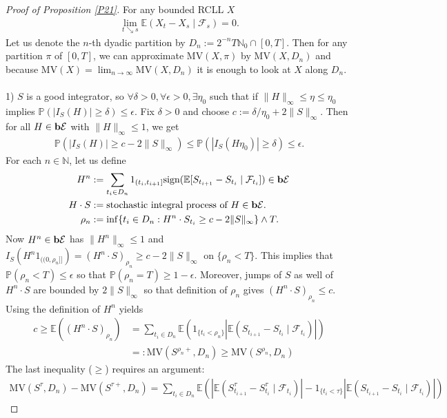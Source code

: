 \documentclass[12pt,a4paper, twoside]{article}
\theoremstyle{definition}
\newcommand{\EE}{\mathbb{E}} %
\newcommand{\PP}{\mathbb{P}} %
\newcommand{\simple}{\textbf{\text{b}}\mathcal{E}}
\newcommand{\sign}{\text{sign}}
\newcommand{\MV}{\text{MV}}
\begin{document}
\begin{proof}[Proof of Proposition \ref{P21}] For any bounded RCLL $X$ 
\begin{align*}
\lim_{t \searrow s} \EE(X_t-X_s \mid \mathcal{F}_s)=0.
\end{align*}
Let us denote the $n$-th dyadic partition by $D_n:= 2^{-n} T \mathbb{N}_0 \cap [0,T]$. Then for any partition $\pi$ of $[0,T]$, we can approximate $\MV(X, \pi)$ by $\MV(X, D_n)$ and because $\MV(X) = \lim_{n \to \infty} \MV(X, D_n)$ it is enough to look at $X$ along $D_n$. 
\\
\\
1) $S$ is a good integrator, so $\forall \delta >0, \forall \epsilon>0, \exists \eta_0$ such that if $\|H\|_\infty \leq \eta \leq \eta_0$ implies $\PP(|I_S(H)| \geq \delta) \leq \epsilon$. Fix $\delta >0$ and choose $c:= \delta/ \eta_0 + 2 \|S\|_\infty$. Then for all $H \in \simple$ with $\|H\|_\infty \leq 1$, we get 
\begin{align*}
\PP(|I_S(H)| \geq c- 2 \|S\|_\infty) \leq \PP(|I_S(H \eta_0)| \geq \delta) \leq \epsilon. 
\end{align*}
\newpage
For each $n \in \mathbb{N}$, let us define
\begin{align*}
H^n &:= \sum_{t_i \in D_n} 1_{(t_i, t_{i+1}]} \sign( \EE[S_{t_{i+1}}-S_{t_i} \mid \mathcal{F}_{t_i}]) \in \simple \\
H \cdot S &:= \text{stochastic integral process of } H \in \simple. \\
\rho_n&:= \inf\{ t_i \in D_n : H^n \cdot S_{t_i} \geq c -2\|S\|_\infty \} \wedge T.
\end{align*}
Now $H^n \in \simple$ has $\|H^n\|_\infty \leq 1$ and $I_S(H^n 1_{(\!(0, \rho_n]\!]}) = (H^n \cdot S)_{\rho_n} \geq c-2\|S\|_\infty$ on $\{ \rho_n < T\}$. This implies that $\PP( \rho_n < T) \leq \epsilon$ so that $\PP( \rho_n = T) \geq 1- \epsilon$. Moreover, jumps of $S$ as well of $H^n \cdot S$ are bounded by $2 \|S\|_\infty$ so that definition of $\rho_n$ gives $(H^n \cdot S)_{\rho_n} \leq c$. Using the definition of $H^n$ yields 
\begin{align*}
c \geq \mathbb{E}((H^n \cdot S)_{\rho_n}) &= \sum_{t_i \in D_n} \EE (1_{\{t_i < \rho_n\}} | \EE(S_{t_{i+1}}-S_{t_i} \mid \mathcal{F}_{t_i}) | ) \tag{*} \\
&=: \MV ( S^{\rho_n+}, D_n) \geq \MV(S^{\rho_n}, D_n)
\end{align*}
The last inequality ($\geq$) requires an argument: 
\begin{align*}
\MV(S^\tau, D_n)- \MV(S^{\tau+}, D_n)= \sum_{t_i \in D_n} \mathbb{E}( | \EE( S_{t_{i+1}}^\tau- S_{t_i}^\tau \mid \mathcal{F}_{t_i}) | - 1_{\{t_i < \tau\}} | \EE(S_{t_{i+1}}- S_{t_i} \mid \mathcal{F}_{t_i}) |) 

\end{align*}
\end{proof}
\end{document}
